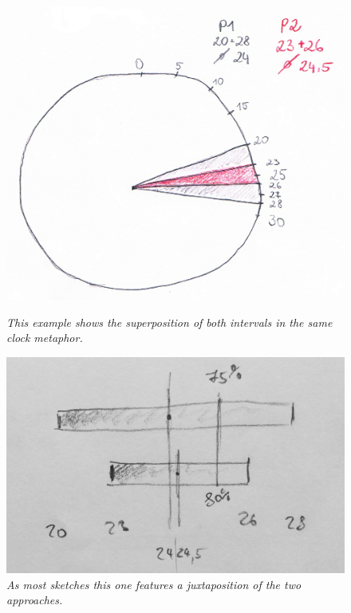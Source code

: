 	\begin{figure}[H]
		\begin{minipage}{.55\textwidth}
			\centering
			\captionsetup{width=0.8\textwidth}
			\includegraphics[height=0.5\textwidth]{figures/superimposed.png}
			\caption{\textit{This example shows the superposition of both intervals in the same clock metaphor.}}
			\label{fig:superimposed}
		\end{minipage}
		\begin{minipage}{.5\textwidth}
			\centering
			\captionsetup{width=1.0\textwidth}
			\includegraphics[height=0.5\textwidth]{figures/juxtaposed.jpg}
			\caption{\textit{As most sketches this one features a juxtaposition of the two approaches.}}
			\label{fig:juxtaposed}
		\end{minipage}
	\end{figure}

